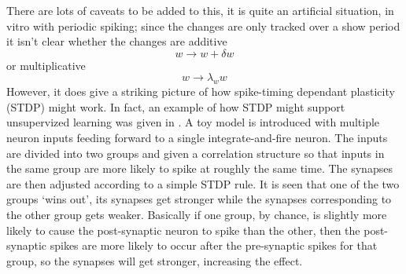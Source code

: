 \documentclass[11pt,a4paper]{scrartcl}
\begin{document}
There are lots of
caveats to be added to this, it is quite an artificial situation, in
vitro with periodic spiking; since the changes are only tracked over a
show period it isn't clear whether the changes are additive
\begin{equation}
w\rightarrow w+\delta w
\end{equation}
or multiplicative
\begin{equation}
w\rightarrow \lambda_w w
\end{equation}
However, it does give a striking picture of how spike-timing dependant
plasticity (STDP) might work. In fact, an example of how STDP might
support unsupervized learning was given in
\cite{SongEtAl2000a,SongAbbott2001a}. A toy model is introduced with
multiple neuron inputs feeding forward to a single integrate-and-fire
neuron. The inputs are divided into two groups and given a correlation
structure so that inputs in the same group are more likely to spike at
roughly the same time. The synapses are then adjusted according to a
simple STDP rule. It is seen that one of the two groups \lq{}wins
out\rq{}, its synapses get stronger while the synapses corresponding
to the other group gets weaker. Basically if one group, by chance, is
slightly more likely to cause the post-synaptic neuron to spike than
the other, then the post-synaptic spikes are more likely to occur
after the pre-synaptic spikes for that group, so the synapses will get
stronger, increasing the effect.
\end{document}
